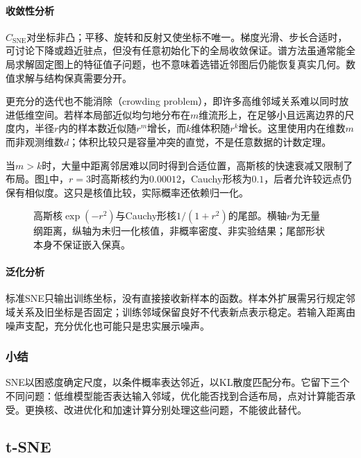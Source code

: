 \paragraph{收敛性分析}

$C_{\mathrm{SNE}}$对坐标非凸；平移、旋转和反射又使坐标不唯一。梯度光滑、步长合适时，可讨论下降或趋近驻点，但没有任意初始化下的全局收敛保证。谱方法虽通常能全局求解固定图上的特征值子问题，也不意味着选错近邻图后仍能恢复真实几何。数值求解与结构保真需要分开。

更充分的迭代也不能消除（crowding problem），即许多高维邻域关系难以同时放进低维空间。若样本局部近似均匀地分布在$m$维流形上，在足够小且远离边界的尺度内，半径$r$内的样本数近似随$r^m$增长，而$k$维体积随$r^k$增长。这里使用内在维数$m$而非观测维数$d$；体积比较只是容量冲突的直觉，不是任意数据的计数定理。

当$m>k$时，大量中距离邻居难以同时得到合适位置，高斯核的快速衰减又限制了布局。图\ref{fig:dim-neighbor-tails}中，$r=3$时高斯核约为$0.00012$，Cauchy形核为$0.1$，后者允许较远点仍保有相似度。这只是核值比较，实际概率还依赖归一化。

\begin{figure}[htbp]
  \centering
  
  \caption{高斯核$\exp(-r^2)$与Cauchy形核$1/(1+r^2)$的尾部。横轴$r$为无量纲距离，纵轴为未归一化核值，非概率密度、非实验结果；尾部形状本身不保证嵌入保真。}
  \label{fig:dim-neighbor-tails}
\end{figure}

\paragraph{泛化分析}

标准SNE只输出训练坐标，没有直接接收新样本的函数。样本外扩展需另行规定邻域关系及旧坐标是否固定；训练邻域保留良好不代表新点表示稳定。若输入距离由噪声支配，充分优化也可能只是忠实展示噪声。

\subsubsection{小结}

SNE以困惑度确定尺度，以条件概率表达邻近，以KL散度匹配分布。它留下三个不同问题：低维模型能否表达输入邻域，优化能否找到合适布局，点对计算能否承受。更换核、改进优化和加速计算分别处理这些问题，不能彼此替代。

\subsection{t-SNE}
\label{sec:dim-tsne}

